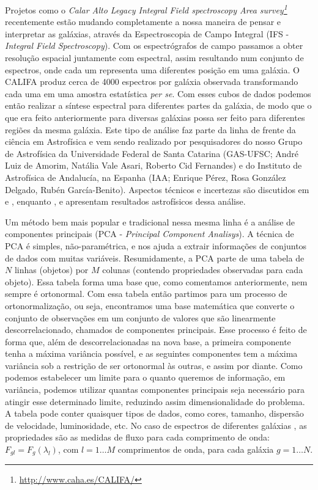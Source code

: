 \documentclass[a4paper,12pt]{article}
\begin{document}
Projetos como o {\em Calar Alto Legacy Integral Field spectroscopy Area survey\footnote{\url{http://www.caha.es/CALIFA/}}} \citep[CALIFA;
][]{CALIFAPresent2012} recentemente estão mudando completamente a nossa maneira de pensar e interpretar as galáxias, através da Espectroscopia de
Campo Integral (IFS - {\em Integral Field Spectroscopy}). Com os espectrógrafos de campo passamos a obter resolução espacial juntamente com espectral,
assim resultando num conjunto de espectros, onde cada um representa uma diferentes posição em uma galáxia. O CALIFA produz cerca de 4000 espectros por
galáxia observada transformando cada uma em uma amostra estatística {\em per se}. Com esses cubos de dados podemos então realizar a síntese espectral
para diferentes partes da galáxia, de modo que o que era feito anteriormente para diversas galáxias possa ser feito para diferentes regiões da mesma
galáxia. Este tipo de análise faz parte da linha de frente da ciência em Astrofísica e vem sendo realizado por pesquisadores do nosso Grupo de
Astrofísica da Universidade Federal de Santa Catarina (GAS-UFSC; André Luiz de Amorim, Natália Vale Asari, Roberto Cid Fernandes) e do Instituto de
Astrofísica de Andalucía, na Espanha (IAA; Enrique Pérez, Rosa González Delgado, Rubén García-Benito). Aspectos técnicos e incertezas são discutidos
em \citet{CidFernandes2013} e \citet{CidFernandes2014}, enquanto \citet{Perez2013}, e \citet{GonzalezDelgado2014} apresentam resultados astrofísicos
dessa análise.

Um método bem mais popular e tradicional nessa mesma linha é a análise de componentes principais (PCA - {\em Principal Component Analisys}). A técnica
de PCA é simples, não-paramétrica, e nos ajuda a extrair informações de conjuntos de dados com muitas variáveis. Resumidamente, a PCA parte de uma
tabela de $N$ linhas (objetos) por $M$ colunas (contendo propriedades observadas para cada objeto). Essa tabela forma uma base que, como comentamos
anteriormente, nem sempre é ortonormal. Com essa tabela então partimos para um processo de ortonormalização, ou seja, encontramos uma base matemática
que converte o conjunto de observações em um conjunto de valores que são linearmente descorrelacionado, chamados de componentes principais. Esse
processo é feito de forma que, além de descorrelacionadas na nova base, a primeira componente tenha a máxima variância possível, e as seguintes
componentes tem a máxima variância sob a restrição de ser ortonormal às outras, e assim por diante. Como podemos estabelecer um limite para o quanto
queremos de informação, em variância, podemos utilizar quantas componentes principais seja necessário para atingir esse determinado limite, reduzindo
assim dimensionalidade do problema. A tabela pode conter quaisquer tipos de dados, como cores, tamanho, dispersão de velocidade, luminosidade, etc. No
caso de espectros de diferentes galáxias \citep[e.g., ][]{Francis1992, Sodre1994, Sodre1997}, as propriedades são as medidas de fluxo para cada
comprimento de onda: $F_{gl} = F_g(\lambda_l)$, com $l = 1 \ldots M$ comprimentos de onda, para cada galáxia $g = 1 \ldots N$.
\end{document}

